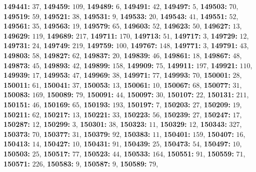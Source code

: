 \textsf{\bfseries 149441:} $37$, \textsf{\bfseries 149459:} $109$, \textsf{\bfseries 149489:} $6$, \textsf{\bfseries 149491:} $42$, \textsf{\bfseries 149497:} $5$, \textsf{\bfseries 149503:} $70$, \textsf{\bfseries 149519:} $59$, \textsf{\bfseries 149521:} $38$, \textsf{\bfseries 149531:} $9$, \textsf{\bfseries 149533:} $20$, \textsf{\bfseries 149543:} $41$, \textsf{\bfseries 149551:} $52$, \textsf{\bfseries 149561:} $35$, \textsf{\bfseries 149563:} $19$, \textsf{\bfseries 149579:} $65$, \textsf{\bfseries 149603:} $52$, \textsf{\bfseries 149623:} $50$, \textsf{\bfseries 149627:} $13$, \textsf{\bfseries 149629:} $119$, \textsf{\bfseries 149689:} $217$, \textsf{\bfseries 149711:} $170$, \textsf{\bfseries 149713:} $51$, \textsf{\bfseries 149717:} $3$, \textsf{\bfseries 149729:} $12$, \textsf{\bfseries 149731:} $24$, \textsf{\bfseries 149749:} $219$, \textsf{\bfseries 149759:} $100$, \textsf{\bfseries 149767:} $148$, \textsf{\bfseries 149771:} $3$, \textsf{\bfseries 149791:} $43$, \textsf{\bfseries 149803:} $58$, \textsf{\bfseries 149827:} $62$, \textsf{\bfseries 149837:} $20$, \textsf{\bfseries 149839:} $46$, \textsf{\bfseries 149861:} $18$, \textsf{\bfseries 149867:} $48$, \textsf{\bfseries 149873:} $45$, \textsf{\bfseries 149893:} $42$, \textsf{\bfseries 149899:} $158$, \textsf{\bfseries 149909:} $75$, \textsf{\bfseries 149911:} $197$, \textsf{\bfseries 149921:} $110$, \textsf{\bfseries 149939:} $17$, \textsf{\bfseries 149953:} $47$, \textsf{\bfseries 149969:} $38$, \textsf{\bfseries 149971:} $77$, \textsf{\bfseries 149993:} $70$, \textsf{\bfseries 150001:} $28$, \textsf{\bfseries 150011:} $61$, \textsf{\bfseries 150041:} $37$, \textsf{\bfseries 150053:} $13$, \textsf{\bfseries 150061:} $10$, \textsf{\bfseries 150067:} $68$, \textsf{\bfseries 150077:} $31$, \textsf{\bfseries 150083:} $169$, \textsf{\bfseries 150089:} $79$, \textsf{\bfseries 150091:} $44$, \textsf{\bfseries 150097:} $30$, \textsf{\bfseries 150107:} $22$, \textsf{\bfseries 150131:} $211$, \textsf{\bfseries 150151:} $46$, \textsf{\bfseries 150169:} $65$, \textsf{\bfseries 150193:} $193$, \textsf{\bfseries 150197:} $7$, \textsf{\bfseries 150203:} $27$, \textsf{\bfseries 150209:} $19$, \textsf{\bfseries 150211:} $62$, \textsf{\bfseries 150217:} $13$, \textsf{\bfseries 150221:} $33$, \textsf{\bfseries 150223:} $56$, \textsf{\bfseries 150239:} $27$, \textsf{\bfseries 150247:} $17$, \textsf{\bfseries 150287:} $12$, \textsf{\bfseries 150299:} $3$, \textsf{\bfseries 150301:} $38$, \textsf{\bfseries 150323:} $11$, \textsf{\bfseries 150329:} $12$, \textsf{\bfseries 150343:} $327$, \textsf{\bfseries 150373:} $70$, \textsf{\bfseries 150377:} $31$, \textsf{\bfseries 150379:} $92$, \textsf{\bfseries 150383:} $11$, \textsf{\bfseries 150401:} $159$, \textsf{\bfseries 150407:} $16$, \textsf{\bfseries 150413:} $14$, \textsf{\bfseries 150427:} $10$, \textsf{\bfseries 150431:} $91$, \textsf{\bfseries 150439:} $25$, \textsf{\bfseries 150473:} $54$, \textsf{\bfseries 150497:} $10$, \textsf{\bfseries 150503:} $25$, \textsf{\bfseries 150517:} $77$, \textsf{\bfseries 150523:} $44$, \textsf{\bfseries 150533:} $164$, \textsf{\bfseries 150551:} $91$, \textsf{\bfseries 150559:} $71$, \textsf{\bfseries 150571:} $226$, \textsf{\bfseries 150583:} $9$, \textsf{\bfseries 150587:} $9$, \textsf{\bfseries 150589:} $79$, 
